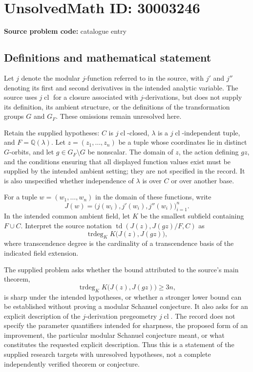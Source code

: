 \documentclass[11pt]{article}
\newcommand{\Q}{\mathbb{Q}}
\begin{document}
\section*{UnsolvedMath ID: 30003246}
\textbf{Source problem code:} catalogue entry
\subsection{Definitions and mathematical statement}
Let \(j\) denote the modular \(j\)-function referred to in the source, with \(j'\) and \(j''\) denoting its first and second derivatives in the intended analytic variable. The source uses \(j\operatorname{cl}\) for a closure associated with \(j\)-derivations, but does not supply its definition, its ambient structure, or the definitions of the transformation groups \(G\) and \(G_F\). These omissions remain unresolved here.

Retain the supplied hypotheses: \(C\) is \(j\operatorname{cl}\)-closed, \(\lambda\) is a \(j\operatorname{cl}\)-independent tuple, and \(F=\Q(\lambda)\). Let \(z=(z_1,\ldots,z_n)\) be a tuple whose coordinates lie in distinct \(G\)-orbits, and let \(g\in G_F\setminus G\) be nonscalar. The domain of \(z\), the action defining \(gz\), and the conditions ensuring that all displayed function values exist must be supplied by the intended ambient setting; they are not specified in the record. It is also unspecified whether independence of \(\lambda\) is over \(C\) or over another base.

For a tuple \(w=(w_1,\ldots,w_n)\) in the domain of these functions, write
\[
J(w)=\bigl(j(w_i),j'(w_i),j''(w_i)\bigr)_{i=1}^{n}.
\]
In the intended common ambient field, let \(K\) be the smallest subfield containing \(F\cup C\). Interpret the source notation \(\operatorname{td}(J(z),J(gz)/F,C)\) as
\[
\operatorname{trdeg}_{K} K\bigl(J(z),J(gz)\bigr),
\]
where transcendence degree is the cardinality of a transcendence basis of the indicated field extension.

The supplied problem asks whether the bound attributed to the source's main theorem,
\[
\operatorname{trdeg}_{K}K\bigl(J(z),J(gz)\bigr)\geq 3n,
\]
is sharp under the intended hypotheses, or whether a stronger lower bound can be established without proving a modular Schanuel conjecture. It also asks for an explicit description of the \(j\)-derivation pregeometry \(j\operatorname{cl}\). The record does not specify the parameter quantifiers intended for sharpness, the proposed form of an improvement, the particular modular Schanuel conjecture meant, or what constitutes the requested explicit description. Thus this is a statement of the supplied research targets with unresolved hypotheses, not a complete independently verified theorem or conjecture.
\end{document}
